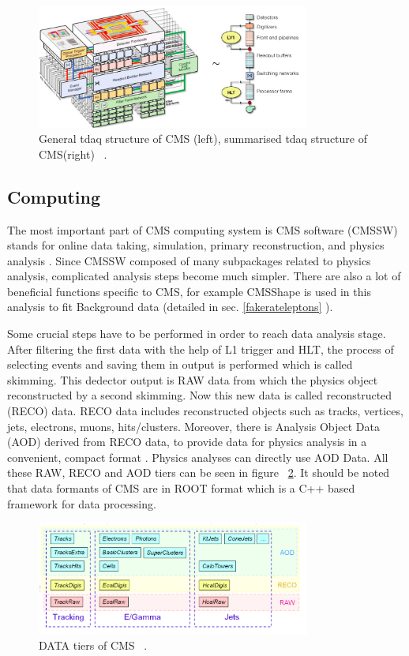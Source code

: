 \documentclass[12pt,oneandhalf,chaparabic,phys,ms,eng]{metu}
\begin{document}
\begin{figure}  [!hbt]
\centering
    \includegraphics[width=0.8\textwidth]{tdaq}
    \caption{\label{tdaq}General tdaq structure of CMS (left), summarised tdaq structure of CMS(right) ~\cite{R16}.}
\end{figure}

\subsection{Computing}
The most important part of CMS computing system is CMS software (CMSSW) stands for online data taking, simulation, primary reconstruction, and physics analysis \cite{R16}. Since CMSSW composed of many subpackages related to physics analysis, complicated analysis steps become much simpler. There are also a lot of beneficial functions specific to CMS, for example CMSShape is used in this analysis to fit Background data (detailed in sec. \ref{fakerateleptons} ). 

Some crucial steps have to be performed in order to reach data analysis stage. After filtering the first data with the help of L1 trigger and HLT,  the process of selecting events and saving them in output is performed which is called skimming. This dedector output is RAW data from which the physics object reconstructed by a second skimming. Now this new data is called reconstructed (RECO) data. RECO data includes reconstructed objects such as tracks, vertices, jets, electrons, muons, hits/clusters. Moreover, there is Analysis Object Data (AOD) derived from RECO data, to provide data for physics analysis in a convenient, compact format \cite{R18}. Physics analyses can directly use AOD Data. All these RAW, RECO and AOD tiers can be seen in figure ~\ref{data1}.
It should be noted that data formants of CMS are in ROOT format which is a C++ based framework for data processing.

\begin{figure}  [!hbt]
\centering
    \includegraphics[width=0.8\textwidth]{data}
    \caption{\label{data1}DATA tiers of CMS ~\cite{R18}.}
\end{figure}
\end{document}
